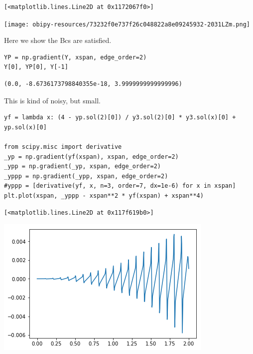 \documentclass[11pt]{article}
\begin{document}
\begin{verbatim}
[<matplotlib.lines.Line2D at 0x1172067f0>]
\end{verbatim}



\begin{center}
\texttt{[image: obipy-resources/73232f0e737f26c048822a8e09245932-2031LZm.png]}
\end{center}


Here we show the Bcs are satisfied.

\begin{verbatim}
YP = np.gradient(Y, xspan, edge_order=2)
Y[0], YP[0], Y[-1]
\end{verbatim}

\begin{verbatim}
(0.0, -8.6736173798840355e-18, 3.9999999999999996)
\end{verbatim}

This is kind of noisy, but small.

\begin{verbatim}
yf = lambda x: (4 - yp.sol(2)[0]) / y3.sol(2)[0] * y3.sol(x)[0] + yp.sol(x)[0]

from scipy.misc import derivative
_yp = np.gradient(yf(xspan), xspan, edge_order=2)
_ypp = np.gradient(_yp, xspan, edge_order=2)
_yppp = np.gradient(_ypp, xspan, edge_order=2)
#yppp = [derivative(yf, x, n=3, order=7, dx=1e-6) for x in xspan]
plt.plot(xspan, _yppp - xspan**2 * yf(xspan) + xspan**4)

\end{verbatim}

\begin{verbatim}
[<matplotlib.lines.Line2D at 0x117f619b0>]
\end{verbatim}



\begin{center}
\includegraphics[width=.9\linewidth]{obipy-resources/73232f0e737f26c048822a8e09245932-2031Yqg.png}
\end{center}
\end{document}
